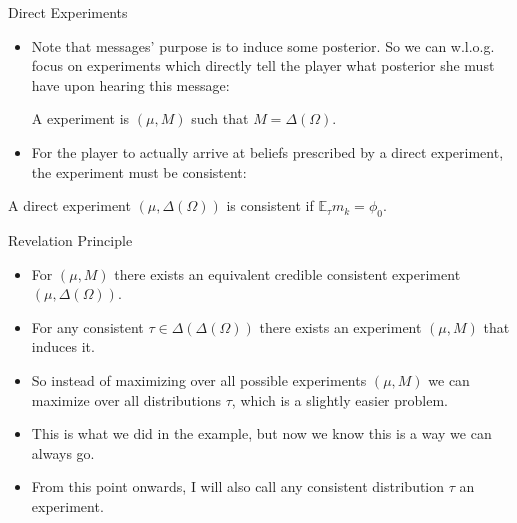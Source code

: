\documentclass[english,10pt
,aspectratio=169
]{beamer}
\begin{document}
\begin{frame}{Direct Experiments}
\begin{itemize}
	\item Note that messages'  purpose is to induce some posterior. So we can w.l.o.g. focus on experiments which directly tell the player what posterior she must have upon hearing this message:
	\begin{definition}
		A  experiment is $(\mu,M)$ such that $M = \varDelta(\Omega)$.
	\end{definition}
	\item For the player to actually arrive at beliefs prescribed by a direct experiment, the experiment must be consistent:
\end{itemize}
\begin{definition}
	A direct experiment $(\mu,\varDelta(\Omega))$ is \alert{consistent} if $\mathbb{E}_\tau m_k = \phi_0$.
\end{definition}
\end{frame}


\begin{frame}{Revelation Principle}
\begin{theorem}
	\begin{itemize}
		\item For  $(\mu,M)$ there exists an equivalent \alert{credible consistent} experiment $(\mu,\varDelta(\Omega))$.
		
		\item For any consistent  $\tau \in \varDelta(\varDelta(\Omega))$ there exists \alert{an experiment} $(\mu,M)$ that induces it.
	\end{itemize}
\end{theorem}
\begin{itemize}
	\item So instead of maximizing over all possible experiments $(\mu,M)$ we can maximize over all distributions $\tau$, which is a slightly easier problem.
	\item This is what we did in the example, but now we know this is a way we can always go.
	\item From this point onwards, I will also call any consistent distribution $\tau$ an experiment.
\end{itemize}
\end{frame}
\end{document}
